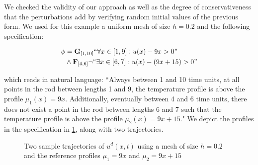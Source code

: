 \documentclass[oribibl]{llncs/llncs}
\newcommand{\Always}{\mathbf{G}}
\newcommand{\Event}{\mathbf{F}}
\begin{document}
We checked the validity of our approach as well as the degree of
conservativeness that the perturbations add by verifying random initial values
of the previous form. We used for this example a uniform mesh of size $h = 0.2$
and the following specification: 

\begin{equation}
    \begin{aligned}
        \phi &= \Always_{[1, 10]} ``\forall x \in [1, 9]: u(x) - 9x > 0" \\
        &\wedge \Event_{[4, 6]} \lnot ``\exists x \in [6, 7]: u(x) - (9x + 15) > 0"
\end{aligned}
\end{equation}

which reads in natural language: ``Always between 1 and 10 time units, at all
points in the rod between lengths 1 and 9, the temperature profile is above the
profile $\mu_1(x) = 9x$. Additionally, eventually between 4 and 6 time units,
there does not exist a point in the rod between lengths 6 and 7 such that the
temperature profile is above the profile $\mu_2(x) = 9x + 15$." We depict the
profiles in the specification in \cref{fig:ex2_evolution}, along with two
trajectories.

\begin{figure}[!t]
    \centering 
        \hfill
        \hfill
        \caption{Two sample trajectories of $u^d(x, t)$ using a mesh of size
        $h=0.2$ and the reference profiles $\mu_1 = 9x$ and $\mu_2 = 9x + 15$}
    \label{fig:ex2_evolution}
\end{figure}
\end{document}

